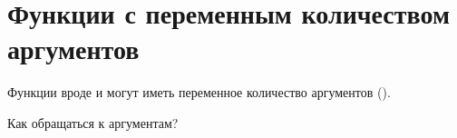 \section{Функции с переменным количеством аргументов}

Функции вроде \printf и \scanf могут иметь переменное количество аргументов ().

Как обращаться к аргументам?






